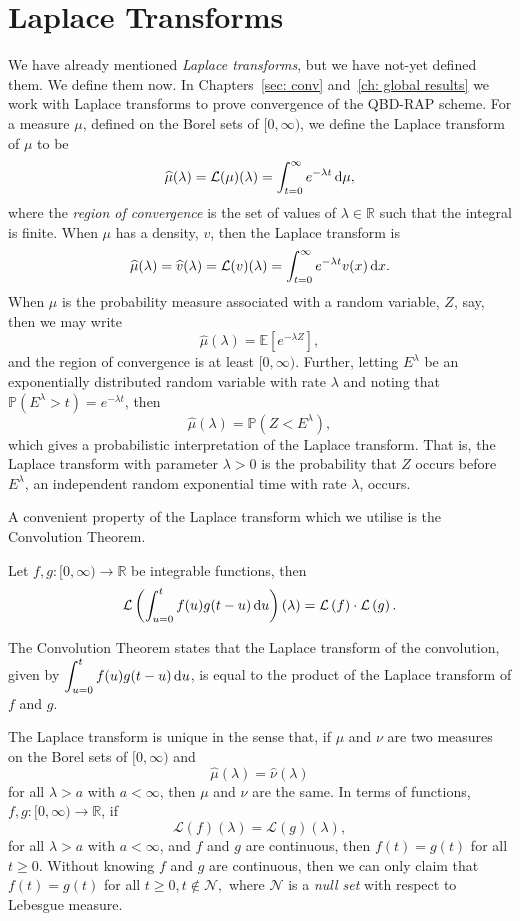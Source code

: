 \section{Laplace Transforms}
We have already mentioned \emph{Laplace transforms}, but we have not-yet defined them. We define them now. In Chapters~\ref{sec: conv} and~\ref{ch: global results} we work with {Laplace transforms} to prove convergence of the QBD-RAP scheme. For a measure \( \mu\), defined on the Borel sets of \([0,\infty)\), we define the Laplace transform of \(\mu\) to be
\[\widehat \mu(\lambda) = \mathcal L(\mu)(\lambda) = \int_{t=0}^\infty e^{-\lambda t}\, \mathrm{d} \mu,\]
where the \emph{region of convergence} is the set of values of \(\lambda\in\mathbb R\) such that the integral is finite. When \(\mu\) has a density, \(v\), then the Laplace transform is 
\[\widehat \mu(\lambda) = \widehat v(\lambda) = \mathcal L(v)(\lambda) = \int_{t=0}^\infty e^{-\lambda t}v(x)\, \mathrm{d} x.\]
When \(\mu\) is the probability measure associated with a random variable, \(Z\), say, then we may write 
\[\widehat \mu(\lambda)=\mathbb E[e^{-\lambda Z}],\]
and the region of convergence is at least \([0,\infty)\). 
Further, letting \(E^\lambda\) be an exponentially distributed random variable with rate \(\lambda\) and noting that \(\mathbb P(E^\lambda >t ) = e^{-\lambda t}\), then 
\[\widehat \mu(\lambda)=\mathbb P(Z<E^\lambda),\]
which gives a probabilistic interpretation of the Laplace transform. That is, the Laplace transform with parameter \(\lambda >0\) is the probability that \(Z\) occurs before \(E^\lambda\), an independent random exponential time with rate \(\lambda\), occurs. 

A convenient property of the Laplace transform which we utilise is the Convolution Theorem. 
\begin{thm}
	Let \(f,g: [0,\infty) \to \mathbb R\) be integrable functions, then 
	\[\mathcal L\left(\int_{u=0}^tf(u)g(t-u)\, \mathrm{d} u\right)(\lambda) = \mathcal L\left(f\right)\cdot \mathcal L\left(g\right).\]
\end{thm}
The Convolution Theorem states that the Laplace transform of the convolution, given by \(\displaystyle \int_{u=0}^tf(u)g(t-u)\, \mathrm{d} u\), is equal to the product of the Laplace transform of \(f\) and \(g\). 

The Laplace transform is unique in the sense that, if \(\mu\) and \(\nu\) are two measures on the Borel sets of \([0,\infty)\) and 
\[\widehat \mu(\lambda) = \widehat \nu(\lambda)\] 
for all \(\lambda > a\) with \(a<\infty\), then \(\mu\) and \(\nu\) are the same. In terms of functions, \(f,g: [0,\infty) \to \mathbb R\), if 
\[\mathcal L(f)(\lambda) = \mathcal L(g)(\lambda),\]
for all \(\lambda > a\) with \(a<\infty\), and \(f\) and \(g\) are continuous, then \(f(t)=g(t)\) for all \(t\geq 0\). Without knowing \(f\) and \(g\) are continuous, then we can only claim that 
\(f(t)=g(t)\) for all \(t\geq 0, t\notin \mathcal N,\) where \(\mathcal N\) is a \emph{null set} with respect to Lebesgue measure. 

